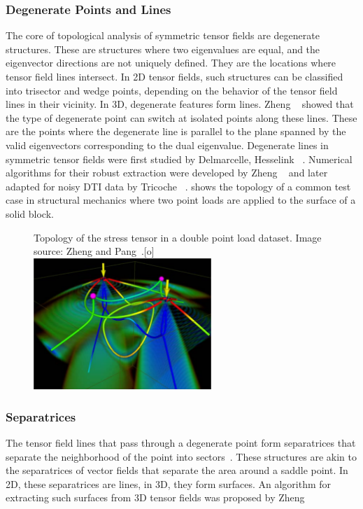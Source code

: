 \subsubsection{Degenerate Points and Lines} %
%
The core of topological analysis of symmetric tensor fields are degenerate
structures.
%
These are structures where two eigenvalues are equal, and the eigenvector
directions are not uniquely defined.
%
They are the locations where tensor field lines intersect.
%
In \ac{2D} tensor fields, such structures can be classified into trisector and
wedge points, depending on the behavior of the tensor field lines in their
vicinity.
%
In \ac{3D}, degenerate features form lines.
%
Zheng \etal~\cite{Zheng2005b} showed that the type of degenerate point can
switch at isolated points along these lines.
%
These are the points where the degenerate line is parallel to the plane spanned
by the valid eigenvectors corresponding to the dual eigenvalue.
%
Degenerate lines in symmetric tensor fields were first studied by Delmarcelle,
Hesselink \etal~\cite{Delmarcelle1994,Hesselink1997}.
%
Numerical algorithms for their robust extraction were developed by Zheng
\etal~\cite{Zheng2004,Zheng2005} and later adapted for noisy \ac{DTI} data by
Tricoche \etal~\cite{Tricoche2008}.
%
 shows the topology of a common test case in
structural mechanics where two point loads are applied to the surface of a solid
block.
%
\begin{figure}[t]
    \begin{captionbeside}
        {Topology of the stress tensor in a double point load dataset. Image
         source: Zheng and Pang~\cite{Zheng2004}.\label{fig:tensor_topology}}[o]
        \includegraphics[width=0.6\textwidth]{figures/tensor_topology.png}
    \end{captionbeside}
\end{figure}
%

\subsubsection{Separatrices} %
%
The tensor field lines that pass through a degenerate point form separatrices
that separate the neighborhood of the point into sectors~\cite{Delmarcelle1994}.
%
These structures are akin to the separatrices of vector fields that separate
the area around a saddle point.
%
In \ac{2D}, these separatrices are lines, in \ac{3D}, they form surfaces.
%
An algorithm for extracting such surfaces from \ac{3D} tensor fields was
proposed by Zheng \etal~\cite{Zheng2005b}
%

